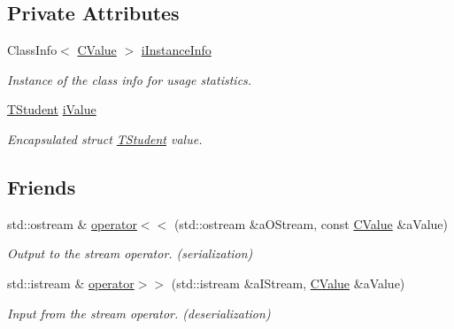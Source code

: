 \subsection*{Private Attributes}
\begin{DoxyCompactItemize}
\item 
Class\+Info$<$ \hyperlink{class_c_value___t_student_1_1_c_value}{C\+Value} $>$ \hyperlink{class_c_value___t_student_1_1_c_value_aa89255973fbe024aeb90238604b599f9}{i\+Instance\+Info}
\begin{DoxyCompactList}\small\item\em Instance of the class info for usage statistics. \end{DoxyCompactList}\item 
\hyperlink{struct_c_value___t_student_1_1_t_student}{T\+Student} \hyperlink{class_c_value___t_student_1_1_c_value_a78375ada0a22e550fa030192f1786010}{i\+Value}
\begin{DoxyCompactList}\small\item\em Encapsulated {\ttfamily struct} \hyperlink{struct_c_value___t_student_1_1_t_student}{T\+Student} value. \end{DoxyCompactList}\end{DoxyCompactItemize}
\subsection*{Friends}
\begin{DoxyCompactItemize}
\item 
std\+::ostream \& \hyperlink{class_c_value___t_student_1_1_c_value_a3d28097fae6bdd5a8146d9ab90f8b62f}{operator$<$$<$} (std\+::ostream \&a\+O\+Stream, const \hyperlink{class_c_value___t_student_1_1_c_value}{C\+Value} \&a\+Value)
\begin{DoxyCompactList}\small\item\em Output to the stream operator. ({\itshape serialization}) \end{DoxyCompactList}\item 
std\+::istream \& \hyperlink{class_c_value___t_student_1_1_c_value_aba05045ca890e398c1211784aebbc9ed}{operator$>$$>$} (std\+::istream \&a\+I\+Stream, \hyperlink{class_c_value___t_student_1_1_c_value}{C\+Value} \&a\+Value)
\begin{DoxyCompactList}\small\item\em Input from the stream operator. ({\itshape deserialization}) \end{DoxyCompactList}\end{DoxyCompactItemize}


